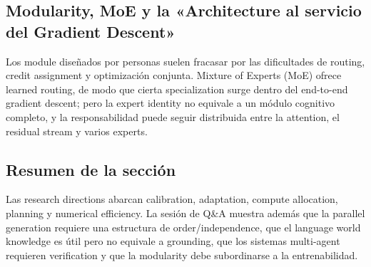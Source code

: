 
\subsection{Modularity, MoE y la «Architecture al servicio del Gradient Descent»}

Los module diseñados por personas suelen fracasar por las dificultades de routing, credit assignment y optimización conjunta. Mixture of Experts (MoE) ofrece learned routing, de modo que cierta specialization surge dentro del end-to-end gradient descent; pero la expert identity no equivale a un módulo cognitivo completo, y la responsabilidad puede seguir distribuida entre la attention, el residual stream y varios experts.


\subsection{Resumen de la sección}

Las research directions abarcan calibration, adaptation, compute allocation, planning y numerical efficiency. La sesión de Q\&A muestra además que la parallel generation requiere una estructura de order/independence, que el language world knowledge es útil pero no equivale a grounding, que los sistemas multi-agent requieren verification y que la modularity debe subordinarse a la entrenabilidad.
